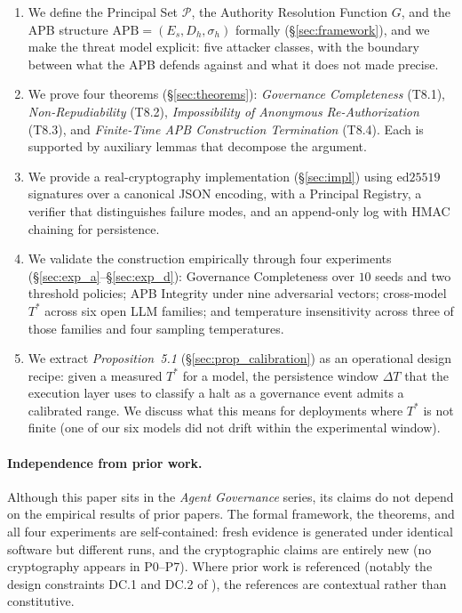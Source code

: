 \documentclass[11pt]{article}
\newcommand{\Pset}{\mathcal{P}}
\newcommand{\Es}{E_s}
\newcommand{\Dh}{D_h}
\newcommand{\sigh}{\sigma_h}
\newcommand{\Tstar}{T^*}
\newcommand{\APB}{\mathrm{APB}}
\begin{document}
\begin{enumerate}[leftmargin=2em, topsep=2pt, itemsep=2pt]
  \item We define the Principal Set $\Pset$, the Authority Resolution
        Function $G$, and the APB structure
        $\APB = (\Es, \Dh, \sigh)$ formally
        (\S\ref{sec:framework}), and we make the threat model explicit:
        five attacker classes, with the boundary between what the APB
        defends against and what it does not made precise.
  \item We prove four theorems (\S\ref{sec:theorems}):
        \emph{Governance Completeness} (T8.1),
        \emph{Non-Repudiability} (T8.2),
        \emph{Impossibility of Anonymous Re-Authorization} (T8.3),
        and \emph{Finite-Time APB Construction Termination} (T8.4).
        Each is supported by auxiliary lemmas that decompose the
        argument.
  \item We provide a real-cryptography implementation
        (\S\ref{sec:impl}) using $\text{ed25519}$ signatures over a
        canonical JSON encoding, with a Principal Registry, a
        verifier that distinguishes failure modes, and an
        append-only log with HMAC chaining for persistence.
  \item We validate the construction empirically through four
        experiments (\S\ref{sec:exp_a}--\S\ref{sec:exp_d}):
        Governance Completeness over $10$ seeds and two threshold
        policies; APB Integrity under nine adversarial vectors;
        cross-model $\Tstar$ across six open LLM families; and
        temperature insensitivity across three of those families
        and four sampling temperatures.
  \item We extract \emph{Proposition~5.1} (\S\ref{sec:prop_calibration})
        as an operational design recipe: given a measured $\Tstar$
        for a model, the persistence window $\Delta T$ that the
        execution layer uses to classify a halt as a governance event
        admits a calibrated range. We discuss what this means for
        deployments where $\Tstar$ is not finite (one of our six
        models did not drift within the experimental window).
\end{enumerate}

\paragraph{Independence from prior work.}
Although this paper sits in the \emph{Agent Governance} series, its claims
do not depend on the empirical results of prior papers. The formal
framework, the theorems, and all four experiments are self-contained:
fresh evidence is generated under identical software but different runs,
and the cryptographic claims are entirely new (no cryptography appears
in P0--P7). Where prior work is referenced (notably the design constraints
DC.1 and DC.2 of \citep{fernandez2026applied}), the references are
contextual rather than constitutive.
\end{document}
